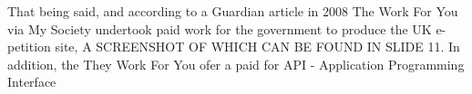 That being said, and according to a Guardian article in 2008
	The Work For You via My Society undertook paid work for the government to produce the UK e-petition site,
		A SCREENSHOT OF WHICH CAN BE FOUND IN SLIDE 11.
	In addition, the They Work For You ofer a paid for API - Application Programming Interface